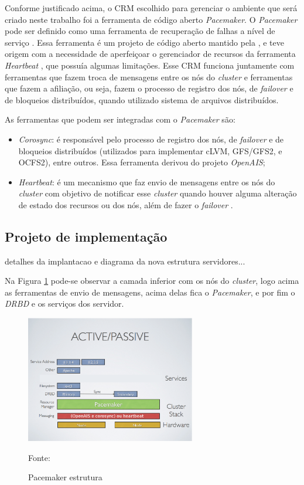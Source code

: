 
Conforme justificado acima, o \ac{CRM} escolhido para gerenciar o ambiente que será criado neste trabalho foi a ferramenta de código aberto 
\textit{Pacemaker}. 
O \textit{Pacemaker} \cite{pacemaker} pode ser definido como uma ferramenta de recuperação de falhas a nível de serviço \cite{perkov2011}. 
Essa ferramenta é um projeto de código aberto mantido pela \cite{clusterlabs}, e teve origem com a necessidade de aperfeiçoar o gerenciador 
de recursos da ferramenta \textit{Heartbeat} \cite{heartbeat}, que possuía algumas limitações. Esse \ac{CRM} funciona juntamente com ferramentas
que fazem troca de mensagens entre os nós do \textit{cluster} e ferramentas que fazem a afiliação, ou seja, fazem o processo de registro dos
nós, de \textit{failover} e de bloqueios distribuídos, quando utilizado sistema de arquivos distribuídos. 

As ferramentas que podem ser integradas com o \textit{Pacemaker} são:
\begin{itemize}
 \item \textit{Corosync}: é responsável pelo processo de registro dos nós, de \textit{failover} e de bloqueios distribuídos (utilizados para 
 implementar cLVM, GFS/GFS2, e OCFS2), entre outros. Essa ferramenta derivou do projeto \textit{OpenAIS};
 \item \textit{Heartbeat}: é um mecanismo que faz envio de mensagens entre os nós do \textit{cluster} com objetivo de notificar esse 
 \textit{cluster} quando houver alguma alteração de estado dos recursos ou dos nós, além de fazer o \textit{failover} \cite{clusterlabs}.
\end{itemize}

\subsection{Projeto de implementação}
\label{section:projetoimpl}

detalhes da implantacao e diagrama da nova estrutura servidores...

Na Figura \ref{fig:pacemaker_tools} pode-se observar a camada inferior com os nós do \textit{cluster}, logo acima as ferramentas de envio de 
mensagens, acima delas fica o \textit{Pacemaker}, e por fim o \textit{DRBD} e os serviços dos servidor.

\begin{figure}[h!]
 \centering
 \includegraphics[width=280px]{img/pacemaker_tools.eps}
 \caption{Pacemaker estrutura}
 Fonte: \citet{pacemaker}
 \label{fig:pacemaker_tools}
\end{figure}

